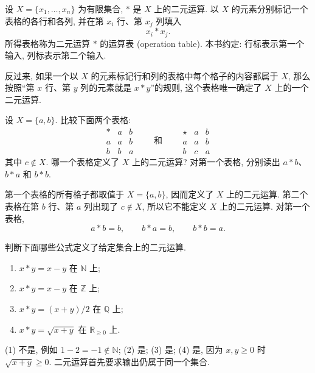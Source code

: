 \documentclass[usesamecnt, thmcnt=section, lang=cn, newtx, 10pt, scheme=chinese]{elegantbook}
\begin{document}
\begin{definition}[运算表]\label{def:alg-operation-table}
设 $X=\{x_1,\ldots,x_n\}$ 为有限集合, $*$ 是 $X$ 上的二元运算. 以 $X$ 的元素分别标记一个表格的各行和各列, 并在第 $x_i$ 行、第 $x_j$ 列填入
\[
 x_i*x_j.
\]
所得表格称为二元运算 $*$ 的{\color{blue}运算表 (operation table)}. 本书约定: 行标表示第一个输入, 列标表示第二个输入.

反过来, 如果一个以 $X$ 的元素标记行和列的表格中每个格子的内容都属于 $X$, 那么按照``第 $x$ 行、第 $y$ 列的元素就是 $x*y$''的规则, 这个表格唯一确定了 $X$ 上的一个二元运算.
\end{definition}

\begin{concept}\label{con:alg-operation-table}
设 $X=\{a,b\}$. 比较下面两个表格:
\[
\begin{array}{c|cc}
 *&a&b\\ \hline
 a&a&b\\
 b&b&a
\end{array}
\qquad\text{和}\qquad
\begin{array}{c|cc}
 \star&a&b\\ \hline
 a&a&b\\
 b&c&a
\end{array}
\]
其中 $c\notin X$. 哪一个表格定义了 $X$ 上的二元运算? 对第一个表格, 分别读出 $a*b$、$b*a$ 和 $b*b$.
\end{concept}

\begin{solution}
第一个表格的所有格子都取值于 $X=\{a,b\}$, 因而定义了 $X$ 上的二元运算. 第二个表格在第 $b$ 行、第 $a$ 列出现了 $c\notin X$, 所以它不能定义 $X$ 上的二元运算. 对第一个表格,
\[
 a*b=b,\qquad b*a=b,\qquad b*b=a.
\]
\end{solution}

\begin{concept}\label{con:alg-operation-01}
判断下面哪些公式定义了给定集合上的二元运算.
\begin{enumerate}[label=\rm(\arabic*)]
  \item $x*y=x-y$ 在 $\mathbb N$ 上;
  \item $x*y=x-y$ 在 $\mathbb Z$ 上;
  \item $x*y=(x+y)/2$ 在 $\mathbb Q$ 上;
  \item $x*y=\sqrt{x+y}$ 在 $\mathbb R_{\geq0}$ 上.
\end{enumerate}
\end{concept}

\begin{solution}
(1) 不是, 例如 $1-2=-1\notin\mathbb N$; (2) 是; (3) 是; (4) 是, 因为 $x,y\geq0$ 时 $\sqrt{x+y}\geq0$. 二元运算首先要求输出仍属于同一个集合.
\end{solution}
\end{document}

